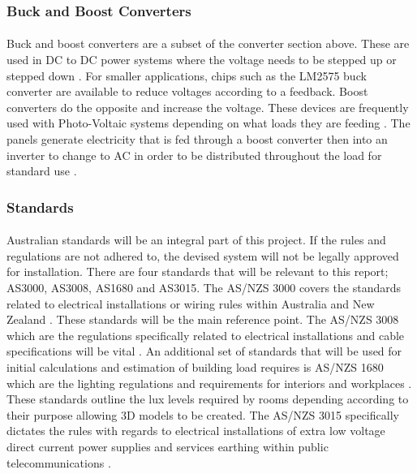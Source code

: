 \subsubsection{Buck and Boost Converters}

\paragraph{}
Buck and boost converters are a subset of the converter section above. These are used in DC to DC power systems where the voltage needs to be stepped up or stepped down \cite{textbook:Abu-Rub2014}. For smaller applications, chips such as the LM2575 buck converter are available to reduce voltages according to a feedback. Boost converters do the opposite and increase the voltage. These devices are frequently used with Photo-Voltaic systems depending on what loads they are feeding \cite{textbook:Abu-Rub2014}. The panels generate electricity that is fed through a boost converter then into an inverter to change to AC in order to be distributed throughout the load for standard use \cite{textbook:Abu-Rub2014}.     


\subsubsection{Standards}

\paragraph{}
Australian standards will be an integral part of this project. If the rules and regulations are not adhered to, the devised system will not be legally approved for installation. There are four standards that will be relevant to this report; AS3000, AS3008, AS1680 and AS3015. The AS/NZS 3000 covers the standards related to electrical installations or wiring rules within Australia and New Zealand \cite{StandardsAustralia2007}. These standards will be the main reference point. The AS/NZS 3008 which are the regulations specifically related to electrical installations and cable specifications will be vital \cite{StandardsAustralia2010}. An additional set of standards that will be used for initial calculations and estimation of building load requires is AS/NZS 1680 which are the lighting regulations and requirements for interiors and workplaces \cite{StandardsAustralia2006}. These standards outline the lux levels required by rooms depending according to their purpose allowing 3D models to be created. The AS/NZS 3015 specifically dictates the rules with regards to electrical installations of extra low voltage direct current power supplies and services earthing within public telecommunications \cite{StandardsAustralia2004}.     

